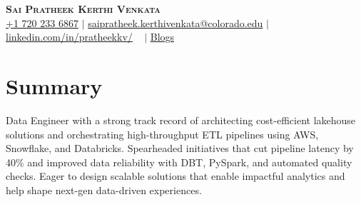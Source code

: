 \documentclass[letterpaper,10pt]{article}
\begin{document}

\begin{center}
    \textbf{\Large \scshape Sai Pratheek Kerthi Venkata} \\ \vspace{3pt}
    \small
    \faMobile \hspace{.5pt} \href{tel:+17202336867}{+1 720 233 6867}
    $|$
    \faAt \hspace{.5pt} \href{mailto:saipratheek.kerthivenkata@colorado.edu}{saipratheek.kerthivenkata@colorado.edu}
    $|$
    \faLinkedinSquare \hspace{.5pt} \href{https://www.linkedin.com/in/pratheekkv/}{linkedin.com/in/pratheekkv/}
    \
    $|$
    \faRssSquare \hspace{.5pt}
    \href{https://www.cloudthat.com/resources/author/sai-pratheek/}{Blogs}
\end{center}
\vspace{-22pt}


\section{Summary}

Data Engineer with a strong track record of architecting cost-efficient lakehouse solutions and orchestrating high-throughput ETL pipelines using AWS, Snowflake, and Databricks. Spearheaded initiatives that cut pipeline latency by 40\% and improved data reliability with DBT, PySpark, and automated quality checks. Eager to design scalable solutions that enable impactful analytics and help shape next-gen data-driven experiences.

\vspace{-10pt}
\fontsize{9}{10}\selectfont
\end{document}
